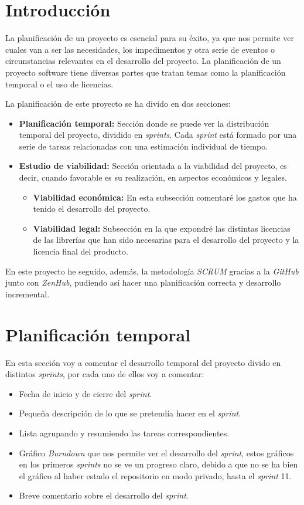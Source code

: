 
\section{Introducción}
La planificación de un proyecto es esencial para su éxito, ya que nos permite ver cuales van a ser las necesidades, los impedimentos y otra serie de eventos o circunstancias relevantes en el desarrollo del proyecto. La planificación de un proyecto software tiene diversas partes que tratan temas como la planificación temporal o el uso de licencias.

La planificación de este proyecto se ha divido en dos secciones:
\begin{itemize}
	\item \textbf{Planificación temporal:} Sección donde se puede ver la distribución temporal del proyecto, dividido en \textit{sprints}. Cada \textit{sprint} está formado por una serie de tareas relacionadas con una estimación individual de tiempo. 
	\item \textbf{Estudio de viabilidad:} Sección orientada a la viabilidad del proyecto, es decir, cuando favorable es su realización, en aspectos económicos y legales.
	\begin{itemize}
		\item \textbf{Viabilidad económica:} En esta subsección comentaré los gastos que ha tenido el desarrollo del proyecto.
		\item \textbf{Viabilidad legal:} Subsección en la que expondré las distintas licencias de las librerías que han sido necesarias para el desarrollo del proyecto y la licencia final del producto.
	\end{itemize}
\end{itemize}

En este proyecto he seguido, además, la metodología \textit{SCRUM} gracias a la \textit{GitHub} junto con \textit{ZenHub}, pudiendo así hacer una planificación correcta y desarrollo incremental.
\section{Planificación temporal}
En esta sección voy a comentar el desarrollo temporal del proyecto divido en distintos \textit{sprints}, por cada uno de ellos voy a comentar:
\begin{itemize}
	\item Fecha de inicio y de cierre del \textit{sprint}.
	\item Pequeña descripción de lo que se pretendía hacer en el \textit{sprint}.
	\item Lista agrupando y resumiendo las tareas correspondientes.
	\item Gráfico \textit{Burndown} que nos permite ver el desarrollo del \textit{sprint}, estos gráficos en los primeros \textit{sprints} no se ve un progreso claro, debido a que no se ha bien el gráfico al haber estado el repositorio en modo privado, hasta el \textit{sprint} 11.
	\item Breve comentario sobre el desarrollo del \textit{sprint}.
\end{itemize}

